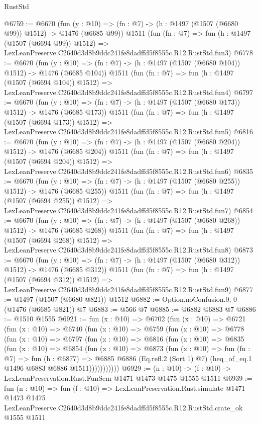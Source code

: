 \begin{lexlean}{RustStd}
\begin{coremodule}
@6759 := @6670
    (fun (y : @10) => (fn : @7) -> (h : @1497 (@1507 (@6680 @99)) @1512) -> @1476 (@6685 @99))
    @1511
    (fun (fn : @7) =>
    fun (h : @1497 (@1507 (@6694 @99)) @1512) =>
    LexLeanPreserve.C2640d3d8b9ddc241fe8dadffd5f8555c.R12.RustStd.fun3)
@6778 := @6670
    (fun (y : @10) => (fn : @7) -> (h : @1497 (@1507 (@6680 @104)) @1512) -> @1476 (@6685 @104))
    @1511
    (fun (fn : @7) =>
    fun (h : @1497 (@1507 (@6694 @104)) @1512) =>
    LexLeanPreserve.C2640d3d8b9ddc241fe8dadffd5f8555c.R12.RustStd.fun4)
@6797 := @6670
    (fun (y : @10) => (fn : @7) -> (h : @1497 (@1507 (@6680 @173)) @1512) -> @1476 (@6685 @173))
    @1511
    (fun (fn : @7) =>
    fun (h : @1497 (@1507 (@6694 @173)) @1512) =>
    LexLeanPreserve.C2640d3d8b9ddc241fe8dadffd5f8555c.R12.RustStd.fun5)
@6816 := @6670
    (fun (y : @10) => (fn : @7) -> (h : @1497 (@1507 (@6680 @204)) @1512) -> @1476 (@6685 @204))
    @1511
    (fun (fn : @7) =>
    fun (h : @1497 (@1507 (@6694 @204)) @1512) =>
    LexLeanPreserve.C2640d3d8b9ddc241fe8dadffd5f8555c.R12.RustStd.fun6)
@6835 := @6670
    (fun (y : @10) => (fn : @7) -> (h : @1497 (@1507 (@6680 @255)) @1512) -> @1476 (@6685 @255))
    @1511
    (fun (fn : @7) =>
    fun (h : @1497 (@1507 (@6694 @255)) @1512) =>
    LexLeanPreserve.C2640d3d8b9ddc241fe8dadffd5f8555c.R12.RustStd.fun7)
@6854 := @6670
    (fun (y : @10) => (fn : @7) -> (h : @1497 (@1507 (@6680 @268)) @1512) -> @1476 (@6685 @268))
    @1511
    (fun (fn : @7) =>
    fun (h : @1497 (@1507 (@6694 @268)) @1512) =>
    LexLeanPreserve.C2640d3d8b9ddc241fe8dadffd5f8555c.R12.RustStd.fun8)
@6873 := @6670
    (fun (y : @10) => (fn : @7) -> (h : @1497 (@1507 (@6680 @312)) @1512) -> @1476 (@6685 @312))
    @1511
    (fun (fn : @7) =>
    fun (h : @1497 (@1507 (@6694 @312)) @1512) =>
    LexLeanPreserve.C2640d3d8b9ddc241fe8dadffd5f8555c.R12.RustStd.fun9)
@6877 := @1497 (@1507 (@6680 @821)) @1512
@6882 := Option.noConfusion.{0, 0} (@1476 (@6685 @821)) @7
@6883 := @566 @7
@6885 := @6882 @6883 @7
@6886 := @1510 @1555
@6921 := fun (x : @10) =>
  @6702
    (fun (x : @10) =>
    @6721
      (fun (x : @10) =>
      @6740
        (fun (x : @10) =>
        @6759
          (fun (x : @10) =>
          @6778
            (fun (x : @10) =>
            @6797
              (fun (x : @10) =>
              @6816
                (fun (x : @10) =>
                @6835
                  (fun (x : @10) =>
                  @6854
                    (fun (x : @10) =>
                    @6873
                      (fun (x : @10) =>
                      fun (fn : @7) =>
                      fun (h : @6877) =>
                      @6885
                        @6886
                        (Eq.refl.{2} (Sort 1) @7)
                        (heq_of_eq.{1} @1496 @6883 @6886 @1511)))))))))))
@6929 := (n : @10) -> (f : @10) -> LexLeanPreservation.Rust.FunSem @1471 @1473 @1475 @1555 @1511
@6939 := fun (n : @10) =>
  fun (f : @10) =>
  LexLeanPreservation.Rust.simulate
    @1471
    @1473
    @1475
    LexLeanPreserve.C2640d3d8b9ddc241fe8dadffd5f8555c.R12.RustStd.crate_ok
    @1555
    @1511
\end{coremodule}
\end{lexlean}
